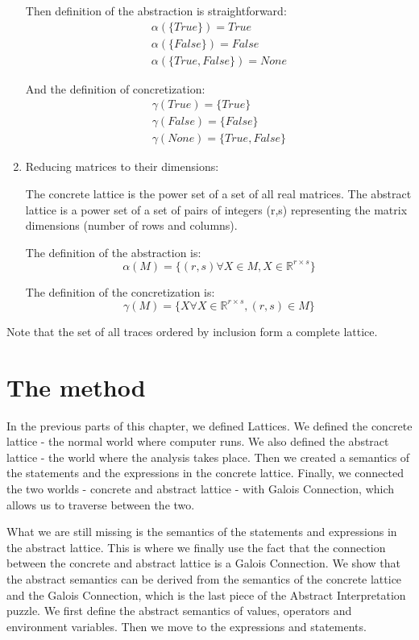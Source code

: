 \begin{enumerate}
    Then definition of the abstraction is straightforward:
    \begin{gather*}
        \alpha(\{True\}) = True\\
        \alpha(\{False\}) = False\\
        \alpha(\{True, False\}) = None
    \end{gather*}

    And the definition of concretization:
    \begin{gather*}
        \gamma(True) = \{True\}\\
        \gamma(False) = \{False\}\\
        \gamma(None) = \{True, False\}
    \end{gather*}

    \item Reducing matrices to their dimensions:

    The concrete lattice is the power set of a set of all real matrices.
    The abstract lattice is a power set of a set of pairs of integers (r,s) representing the matrix dimensions (number
    of rows and columns).

    The definition of the abstraction is:
    \[\alpha(M) = \{(r, s) \forall X \in M, X \in \mathbb{R}^{r \times s}\}\]

    The definition of the concretization is:
    \[\gamma(M) = \{X \forall X \in \mathbb{R}^{r \times s}, (r,s) \in M\}\]
\end{enumerate}

Note that the set of all traces ordered by inclusion form a complete lattice. %

\section{The method} %

In the previous parts of this chapter, we defined Lattices.
We defined the concrete lattice - the normal world where computer runs.
We also defined the abstract lattice - the world where the analysis takes place.
Then we created a semantics of the statements and the expressions in the concrete lattice.
Finally, we connected the two worlds - concrete and abstract lattice - with Galois Connection, which allows us to
traverse between the two.

What we are still missing is the semantics of the statements and expressions in the abstract lattice.
This is where we finally use the fact that the connection between the concrete and abstract lattice is a Galois
Connection.
We show that the abstract semantics can be derived from the semantics of the concrete lattice and the Galois Connection,
which is the last piece of the Abstract Interpretation puzzle.
We first define the abstract semantics of values, operators and environment variables.
Then we move to the expressions and statements.

